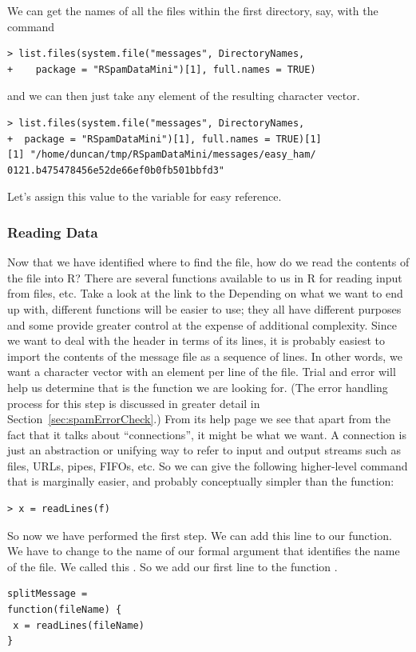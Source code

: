 We can get the names of all the files within the
first directory, say, with the command
\begin{verbatim}
> list.files(system.file("messages", DirectoryNames, 
+    package = "RSpamDataMini")[1], full.names = TRUE)
\end{verbatim}
and we can then just take any element of the resulting character vector.
\begin{verbatim}
> list.files(system.file("messages", DirectoryNames, 
+  package = "RSpamDataMini")[1], full.names = TRUE)[1]
[1] "/home/duncan/tmp/RSpamDataMini/messages/easy_ham/
0121.b475478456e52de66ef0b0fb501bbfd3"
\end{verbatim}
Let's assign this value to the variable
 for easy reference.


\subsubsection{Reading Data}
Now that we have identified where to find the file,
how do we read the contents of the file into R?  There are several
functions available to us in R for reading input from files, etc.
Take a look at the link to the   
Depending on what we want to end up with, 
different functions will be easier to use; they all have
different purposes and some provide greater control at the 
expense of additional complexity.
Since we want to deal with the header in terms of its
lines, it is probably easiest to import the contents
of the message file as a sequence of lines.
In other words, we want a character vector
with an element per line of the file.
Trial and error will help us determine that 
 is the function we are looking for.
(The error handling process for this step is discussed in greater detail 
in Section~\ref{sec:spamErrorCheck}.)
From its help page we see that apart from the fact that it 
talks about ``connections'', it might be what we want.  
A connection is just an abstraction or unifying way to refer 
to input and output streams such as files, URLs, pipes, FIFOs, etc. 
So we can give the following higher-level command that is
marginally easier, and probably conceptually simpler than
the  function:

\begin{verbatim}
> x = readLines(f)
\end{verbatim}

So now we have performed the first step.  We can add this line to our
function.  We have to change  to the name of our formal argument
that identifies the name of the file.  We called this
.
So we add our first line to the function .
\begin{verbatim}
splitMessage =
function(fileName) {
 x = readLines(fileName)
}
\end{verbatim}


